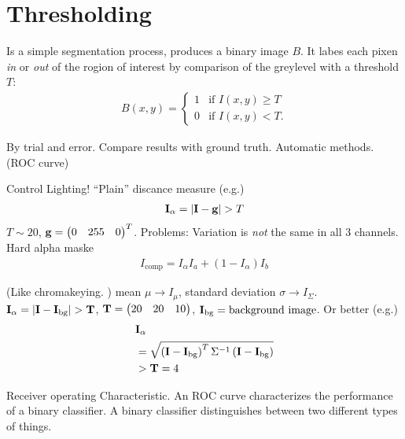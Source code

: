 \section{Thresholding}
Is a simple segmentation process, produces a binary image $B$. It labes each pixen \emph{in} or \emph{out} of the rogion of interest by comparison of the greylevel with a threshold $T$:
\begin{gather*}
	B(x,y)=
	\begin{cases}
		1&\text{if }I(x,y)\geq T\\
		0&\text{if }I(x,y)<T.
	\end{cases}
\end{gather*}
\begin{compactdesc}
	\item[\lp{Choosing $T$}] By trial and error. Compare results with ground truth. Automatic methods. (ROC curve)
	\item[\lp{Chromakeying}] Control Lighting! ``Plain'' discance measure (e.g.)
		\begin{gather*}
			\bm{\mathrm{I}}_{\alpha}=\left\lvert \bm{\mathrm{I}}-\bm{\mathrm{g}} \right\rvert>T
		\end{gather*}
		$T\sim 20$, $\bm{\mathrm{g}}=
		\begin{pmatrix}
			0&255&0
		\end{pmatrix}^{T}
		$. Problems: Variation is \emph{not} the same in all 3 channels. Hard alpha maske
		\begin{gather*}
			I_{\text{comp}}=I_{\alpha}I_{a}+\left( 1-I_{\alpha} \right)I_b
		\end{gather*}
	\item[\lp{Gaussian model per pixel}] (Like chromakeying. ) mean $\mu\to I_{\mu}$, standard deviation $\sigma\to I_{\Sigma}$. $\bm{\mathrm{I}}_{\alpha}=\left\lvert \bm{\mathrm{I}}-\bm{\mathrm{I}}_{\text{bg}} \right\rvert>\bm{\mathrm{T}}$, $\bm{\mathrm{T}}=
		\begin{pmatrix}
			20&20&10
		\end{pmatrix}
		$, $\bm{\mathrm{I}}_{\text{bg}}=\text{background image}$. Or better (e.g.)
		\begin{align*}
			&\bm{\mathrm{I}}_{\alpha}\\
			&=\sqrt{\left( \bm{\mathrm{I}}-\bm{\mathrm{I}}_{\text{bg}} \right)^T\Sigma^{-1}\left( \bm{\mathrm{I}}-\bm{\mathrm{I}}_{\text{bg}} \right)}\\
			&>\bm{\mathrm{T}}=4
		\end{align*}
	\item[\lp{ROC Analysis}] Receiver operating Characteristic. An ROC curve characterizes the performance of a binary classifier. A binary classifier distinguishes between two different types of things.

\end{compactdesc}
